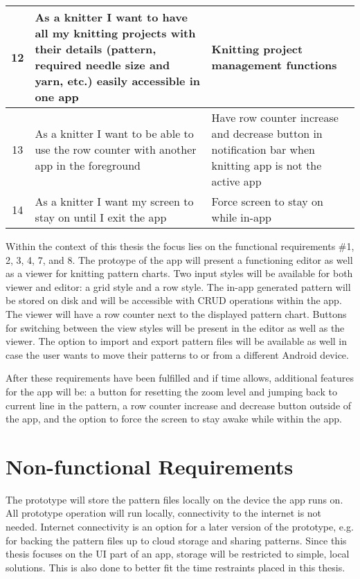 \begin{longtable}{| c | p{6.5cm} | p{6.5cm} |}
	12 & As a knitter I want to have all my knitting projects with their details (pattern, required needle size and yarn, etc.) easily accessible in one app & Knitting project management functions  \\ \hline
	13 & As a knitter I want to be able to use the row counter with another app in the foreground &  Have row counter increase and decrease button in notification bar when knitting app is not the active app \\ \hline
	14 & As a knitter I want my screen to stay on until I exit the app & Force screen to stay on while in-app \\ \hline
\end{longtable}

Within the context of this thesis the focus lies on the functional requirements \#1, 2, 3, 4, 7, and 8. The protoype of the app will present a functioning editor as well as a viewer for knitting pattern charts. Two input styles will be available for both viewer and editor: a grid style and a row style. The in-app generated pattern will be stored on disk and will be accessible with CRUD operations within the app. The viewer will have a row counter next to the displayed pattern chart. Buttons for switching between the view styles will be present in the editor as well as the viewer. The option to import and export pattern files will be available as well in case the user wants to move their patterns to or from a different Android device. 

After these requirements have been fulfilled and if time allows, additional features for the app will be: a button for resetting the zoom level and jumping back to current line in the pattern, a row counter increase and decrease button outside of the app, and the option to force the screen to stay awake while within the app.

\section{Non-functional Requirements}

The prototype will store the pattern files locally on the device the app runs on. All prototype operation will run locally, connectivity to the internet is not needed. Internet connectivity is an option for a later version of the prototype, e.g. for backing the pattern files up to cloud storage and sharing patterns. Since this thesis focuses on the \gls{UI} part of an app, storage will be restricted to simple, local solutions. This is also done to better fit the time restraints placed in this thesis.